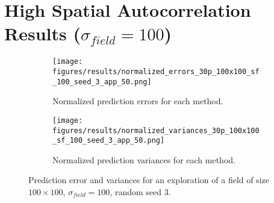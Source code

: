 \FloatBarrier
\clearpage

\section{High Spatial Autocorrelation Results ($\sigma_{field} = 100$)} \label{sec:s3_sigma100}

\begin{figure}[htb!]
    \centering
    \begin{subfigure}[t]{0.50\textwidth}
        \centering
        \texttt{[image: figures/results/normalized\_errors\_30p\_100x100\_sf\_100\_seed\_3\_app\_50.png]}
        \ssp
        \captionsetup{skip=0.20\baselineskip,size=footnotesize}
        \caption{Normalized prediction errors for each method.}
    \end{subfigure}%
    \begin{subfigure}[t]{0.50\textwidth}
        \centering
        \texttt{[image: figures/results/normalized\_variances\_30p\_100x100\_sf\_100\_seed\_3\_app\_50.png]}
        \ssp
        \captionsetup{skip=0.20\baselineskip,size=footnotesize}
        \caption{Normalized prediction variances for each method.}
    \end{subfigure}%
    \ssp
    \captionsetup{skip=0.20\baselineskip}
    \caption{Prediction error and variances for an exploration of a field of size $100 \times 100$, $\sigma_{field} = 100$, random seed 3.}
    \label{fig:s3_errvar100}
\end{figure}

